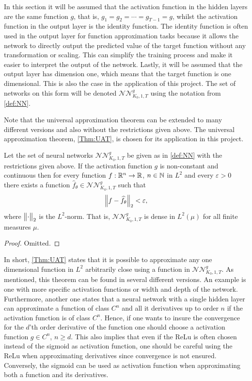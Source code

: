 In this section it will be assumed that the activation function in the hidden layers are the same function $g$, that is, $g_1 = g_2 = \cdots = g_{T-1} = g$, whilst the activation function in the output layer is the identity function. The identity function is often used in the output layer for function approximation tasks because it allows the network to directly output the predicted value of the target function without any transformation or scaling. This can simplify the training process and make it easier to interpret the output of the network. Lastly, it will be assumed that the output layer has dimension one, which means that the target function is one dimensional. This is also the case in the application of this project. The set of networks on this form will be denoted $\mathcal{NN}^g_{K_0, 1, T}$ using the notation from \autoref{def:NN}. 

Note that the universal approximation theorem can be extended to many different versions and also without the restrictions given above. The universal approximation theorem, \autoref{Thm:UAT}, is chosen for its application in this project. 
\begin{thm} \label{Thm:UAT}
    Let the set of neural networks $\mathcal{NN}^g_{K_0, 1, T}$ be given as in \autoref{def:NN} with the restrictions given above. If the activation function $g$ is non-constant and continuous then for every function $f:\mathbb{R}^n \to \mathbb{R}$, $n\in \mathbb{N}$ in $L^2$ and every $\varepsilon > 0$ there exists a function $\hat{f}_{\theta} \in \mathcal{NN}^g_{K_0, 1, T}$ such that
    \begin{align*}
        \norm{f - \hat{f}_{\theta}}_2 < \varepsilon, 
    \end{align*}
    where $\norm{\cdot}_2$ is the $L^2$-norm. That is, $\mathcal{NN}^g_{K_0, 1, T}$ is dense in $L^2(\mu)$ for all finite measures $\mu$.
\end{thm}
\begin{proof}
    Omitted.
\end{proof}

In short, \autoref{Thm:UAT} states that it is possible to approximate any one dimensional function in $L^2$ arbitrarily close using a function in $\mathcal{NN}^g_{K_0, 1, T}$. As mentioned, this theorem can be found in several different versions. An example is one with more specific activation functions or width and depth of the network. Furthermore, another one states that a neural network with a single hidden layer can approximate a function of class $C^n$ and all it derivatives up to order $n$ if the activation function is of class $C^n$. Hence, if one wants to insure the convergence for the $d$'th order derivative of the function one should choose a activation function $g \in C^n$, $n \geq d$. This also implies that even if the ReLu is often chosen instead of the sigmoid as activation function, one should be careful using the ReLu when approximating derivatives since convergence is not ensured. Conversely, the sigmoid can be used as activation function when approximating both a function and its derivatives.

